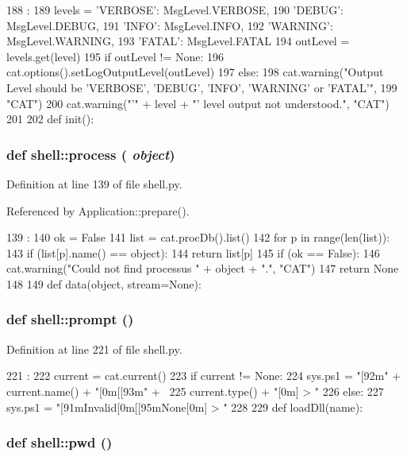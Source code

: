 \begin{DoxyCode}
188                              :
189   levels = {'VERBOSE': MsgLevel.VERBOSE,
190             'DEBUG': MsgLevel.DEBUG,
191             'INFO': MsgLevel.INFO,
192             'WARNING': MsgLevel.WARNING,
193             'FATAL': MsgLevel.FATAL}
194   outLevel = levels.get(level)
195   if outLevel != None:
196     cat.options().setLogOutputLevel(outLevel)
197   else:
198     cat.warning("Output Level should be 'VERBOSE', 'DEBUG', 'INFO', 'WARNING' or 
      'FATAL'",
199                 "CAT")
200     cat.warning("'" + level + "' level output not understood.", "CAT")
201 
202 
def init():
\end{DoxyCode}
\hypertarget{namespaceshell_a9cb3ff540ee16ae2399dd7a2cc10a740}{
\subsubsection[{process}]{\setlength{\rightskip}{0pt plus 5cm}def shell::process ( {\em object})}}
\label{namespaceshell_a9cb3ff540ee16ae2399dd7a2cc10a740}


Definition at line 139 of file shell.py.

Referenced by Application::prepare().


\begin{DoxyCode}
139                    :
140   ok = False
141   list = cat.procDb().list()
142   for p in range(len(list)):
143     if (list[p].name() == object):
144       return list[p]
145   if (ok == False):
146     cat.warning("Could not find processus " + object + ".", "CAT")
147     return None
148 
149 
def data(object, stream=None):
\end{DoxyCode}
\hypertarget{namespaceshell_a66a6092abd286626778dc4efdc5a0e59}{
\subsubsection[{prompt}]{\setlength{\rightskip}{0pt plus 5cm}def shell::prompt ()}}
\label{namespaceshell_a66a6092abd286626778dc4efdc5a0e59}


Definition at line 221 of file shell.py.


\begin{DoxyCode}
221             :
222   current = cat.current()
223   if current != None:
224     sys.ps1 = "[92m" + current.name() + "[0m[[93m" + \
225         current.type() + "[0m] > "
226   else:
227     sys.ps1 = "[91mInvalid[0m[[95mNone[0m] > "
228 
229 
def loadDll(name):
\end{DoxyCode}
\hypertarget{namespaceshell_a358e751a326de2a94f6b5905cfdf6def}{
\subsubsection[{pwd}]{\setlength{\rightskip}{0pt plus 5cm}def shell::pwd ()}}
\label{namespaceshell_a358e751a326de2a94f6b5905cfdf6def}


